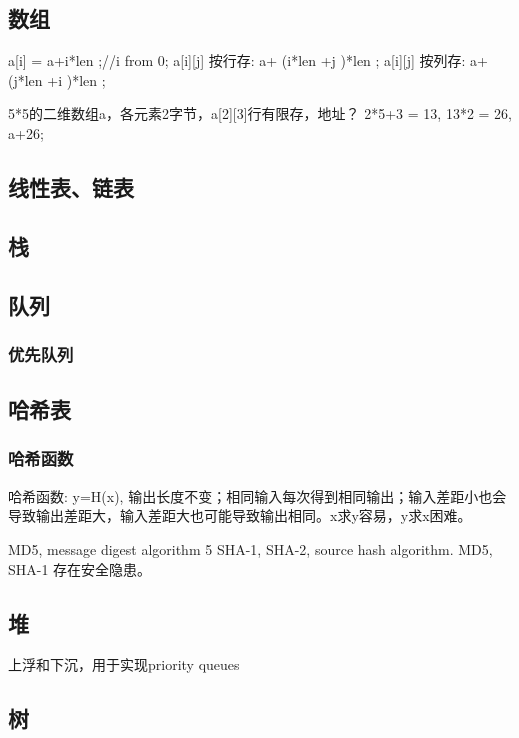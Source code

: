 \documentclass[UTF8]{../computerUniverse}
\begin{document}
\subsection{数组}
 a[i] = a+i*len ;//i from 0;
 a[i][j]  按行存: a+ (i*len +j )*len ;
 a[i][j]  按列存: a+ (j*len +i )*len ;

 5*5的二维数组a，各元素2字节，a[2][3]行有限存，地址？
 2*5+3 = 13, 13*2 = 26, a+26;



 

\subsection{线性表、链表}



\subsection{栈}


\subsection{队列}

\subsubsection{优先队列}


\subsection{哈希表}

\subsubsection{哈希函数}
哈希函数: y=H(x), 输出长度不变；相同输入每次得到相同输出；输入差距小也会导致输出差距大，输入差距大也可能导致输出相同。x求y容易，y求x困难。

MD5, message digest algorithm 5
SHA-1, SHA-2, source hash algorithm.
MD5, SHA-1 存在安全隐患。




\subsection{堆}
上浮和下沉，用于实现priority queues


\subsection{树}
\end{document}

